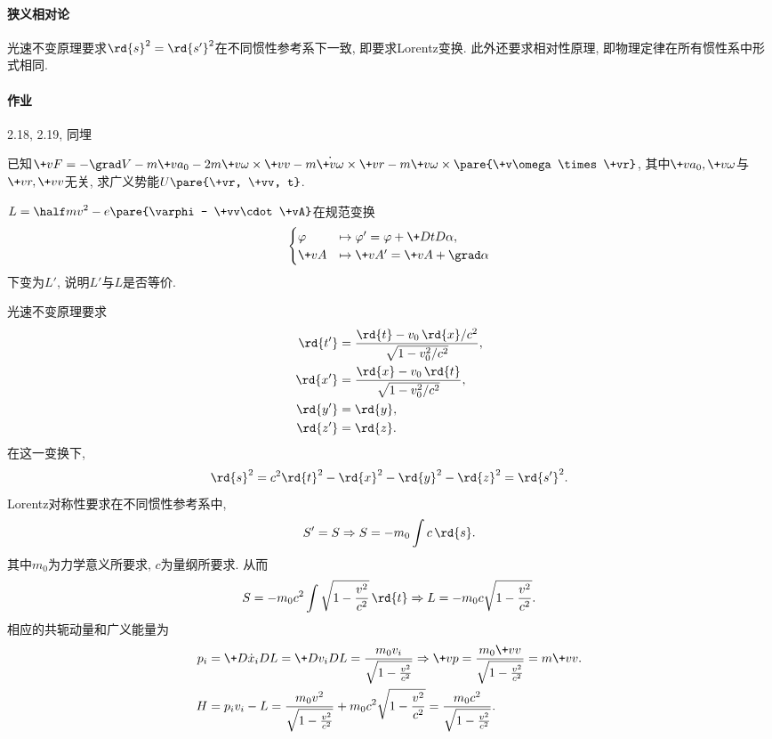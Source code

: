 \documentclass{ctexart}
\begin{document}

\paragraph{狭义相对论} %
\label{par:狭义相对论}

光速不变原理要求$\rd{s}^2 = \rd{s'}^2$在不同惯性参考系下一致, 即要求Lorentz变换. 此外还要求相对性原理, 即物理定律在所有惯性系中形式相同.


\paragraph{作业} %
\label{par:作业}

2.18, 2.19, 同埋
\begin{ex}
    已知$\+vF = -\grad V - m\+va_0 - 2m\+v\omega\times\+vv - m\dot{\+v\omega}\times\+vr - m\+v\omega\times\pare{\+v\omega \times\+vr}$, 其中$\+va_0, \+v\omega$与$\+vr, \+vv$无关, 求广义势能$U\pare{\+vr, \+vv, t}$.
\end{ex}
\begin{ex}
    $L = \displaystyle \half mv^2 - e\pare{\varphi - \+vv\cdot\+vA}$在规范变换
    \[ \begin{cases}
        \varphi &\mapsto \varphi' = \varphi + \displaystyle \+DtD\alpha,\\
        \+vA &\mapsto \+vA' = \+vA + \grad \alpha
    \end{cases} \]
    下变为$L'$, 说明$L'$与$L$是否等价.
\end{ex}
光速不变原理要求
\begin{align*}
    \rd{t'} &= \frac{\rd{t} - v_0 \,\rd{x} / c^2}{\sqrt{1-v_0^2/c^2}}, \\
    \rd{x'} &= \frac{\rd{x} - v_0 \,\rd{t}}{\sqrt{1-v_0^2/c^2}}, \\
    \rd{y'} &= \rd{y}, \\
    \rd{z'} &= \rd{z}.
\end{align*}
在这一变换下,
\[ \rd{s}^2 = c^2 \rd{t}^2 - \rd{x}^2 - \rd{y}^2 - \rd{z}^2 = \rd{s'}^2. \]
Lorentz对称性要求在不同惯性参考系中,
\[ S' = S \Rightarrow S = -m_0\int c\, \rd{s}. \]
其中$m_0$为力学意义所要求, $c$为量纲所要求. 从而
\[ S = -m_0 c^2 \int \sqrt{1-\frac{v^2}{c^2}}\,\rd{t} \Rightarrow L = -m_0 c \sqrt{1-\frac{v^2}{c^2}}. \]
相应的共轭动量和广义能量为
\begin{align*}
    p_i &= \+D{\dot{x}_i}DL = \+D{v_i}DL = \frac{m_0v_i}{\sqrt{1-\frac{v^2}{c^2}}} \Rightarrow \+vp = \frac{m_0\+vv}{\sqrt{1-\frac{v^2}{c^2}}} = m\+vv. \\
    H &= p_iv_i - L = \frac{m_0v^2}{\sqrt{1-\frac{v^2}{c^2}}} + m_0c^2\sqrt{1-\frac{v^2}{c^2}} = \frac{m_0c^2}{\sqrt{1-\frac{v^2}{c^2}}}.
\end{align*}
\end{document}
